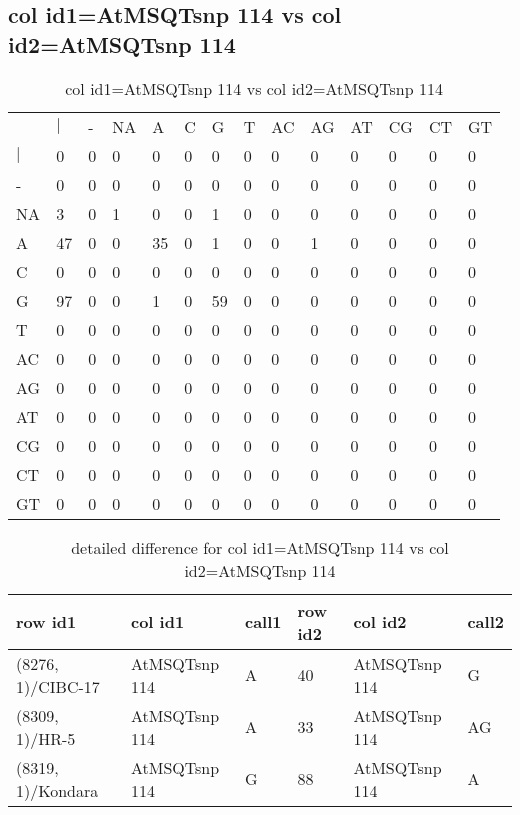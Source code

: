 \subsection{col id1=AtMSQTsnp 114 vs col id2=AtMSQTsnp 114}
\begin{center}
\begin{longtable}{|l|l|l|l|l|l|l|l|l|l|l|l|l|l|}
\caption{col id1=AtMSQTsnp 114 vs col id2=AtMSQTsnp 114} \label{table_dm506}\\
\hline
\\
\hline
&$|$&-&NA&A&C&G&T&AC&AG&AT&CG&CT&GT\\
$|$&0&0&0&0&0&0&0&0&0&0&0&0&0\\
-&0&0&0&0&0&0&0&0&0&0&0&0&0\\
NA&3&0&1&0&0&1&0&0&0&0&0&0&0\\
A&47&0&0&35&0&1&0&0&1&0&0&0&0\\
C&0&0&0&0&0&0&0&0&0&0&0&0&0\\
G&97&0&0&1&0&59&0&0&0&0&0&0&0\\
T&0&0&0&0&0&0&0&0&0&0&0&0&0\\
AC&0&0&0&0&0&0&0&0&0&0&0&0&0\\
AG&0&0&0&0&0&0&0&0&0&0&0&0&0\\
AT&0&0&0&0&0&0&0&0&0&0&0&0&0\\
CG&0&0&0&0&0&0&0&0&0&0&0&0&0\\
CT&0&0&0&0&0&0&0&0&0&0&0&0&0\\
GT&0&0&0&0&0&0&0&0&0&0&0&0&0\\
\hline
\end{longtable}
\end{center}

\begin{center}
\begin{longtable}{|l|l|l|l|l|l|}
\caption{detailed difference for col id1=AtMSQTsnp 114 vs col id2=AtMSQTsnp 114} \label{table_dm507}\\
\hline
row id1&col id1&call1&row id2&col id2&call2\\
\hline
(8276, 1)/CIBC-17&AtMSQTsnp 114&A&40&AtMSQTsnp 114&G\\
(8309, 1)/HR-5&AtMSQTsnp 114&A&33&AtMSQTsnp 114&AG\\
(8319, 1)/Kondara&AtMSQTsnp 114&G&88&AtMSQTsnp 114&A\\
\hline
\end{longtable}
\end{center}

